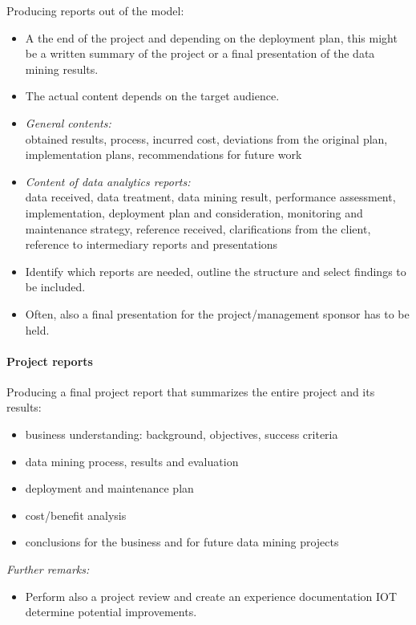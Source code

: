 \documentclass[a4paper, landscape, 6pt, fleqn]{scrartcl}
\begin{document}
\begin{multicols*}{4}
Producing reports out of the model:
\begin{itemize}
\item A the end of the project and depending on the deployment plan, this might be a written summary of the project or a final presentation of the data mining results.
\item The actual content depends on the target audience.
\item \textit{General contents:} \\
obtained results, process, incurred cost, deviations from the original plan, implementation plans, recommendations for future work
\item \textit{Content of data analytics reports:} \\
data received, data treatment, data mining result, performance assessment, implementation, deployment plan and consideration, monitoring and maintenance strategy, reference received, clarifications from the client, reference to intermediary reports and presentations
\item Identify which reports are needed, outline the structure and select findings to be included.
\item Often, also a final presentation for the project/management sponsor has to be held.
\end{itemize}

\paragraph{Project reports}

Producing a final project report that summarizes the entire project and its results:
\begin{itemize}
\item business understanding: background, objectives, success criteria
\item data mining process, results and evaluation
\item deployment and maintenance plan
\item cost/benefit analysis
\item conclusions for the business and for future data mining projects
\end{itemize}

\textit{Further remarks:}
\begin{itemize}
\item Perform also a project review and create an experience documentation IOT determine potential improvements.
\end{itemize}


\end{multicols*}
\end{document}
